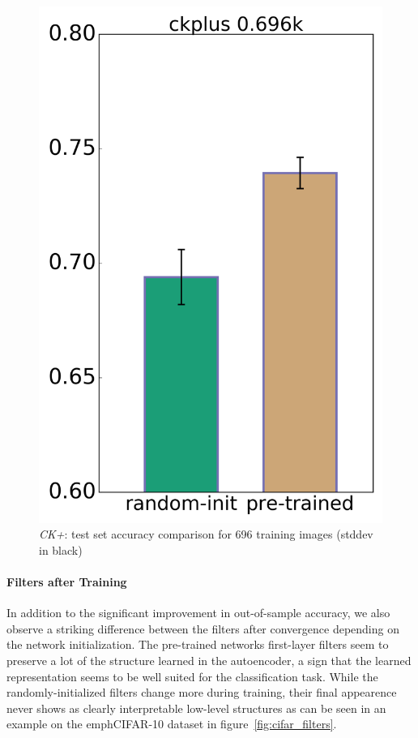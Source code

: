 \documentclass{article}
\begin{document}
    \begin{figure}
      \centering
      \includegraphics[width=0.33\linewidth]{../box_plots/boxplots_ckplus.png}
      \caption{\emph{CK+}: test set accuracy comparison for 696 training images (stddev in black)}
      \label{fig:ckplus_plot}
    \end{figure}

      \paragraph{Filters after Training}

      In addition to the significant improvement in out-of-sample accuracy, we also observe a striking difference between the filters after convergence depending on the network initialization. The pre-trained networks first-layer filters seem to preserve a lot of the structure learned in the autoencoder, a sign that the learned representation seems to be well suited for the classification task. While the randomly-initialized filters change more during training, their final appearence never shows as clearly interpretable low-level structures as can be seen in an example on the emph{CIFAR-10} dataset in figure~\ref{fig:cifar_filters}.  
\end{document}
